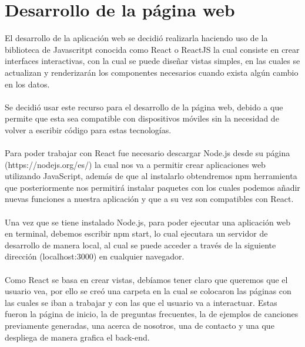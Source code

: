 \documentclass[12pt, a4paper, titlepage]{report}
\begin{document}
\section{Desarrollo de la página web}
El desarrollo de la aplicación web se decidió realizarla haciendo uso de la biblioteca de Javascritpt conocida como React o ReactJS la cual consiste en crear interfaces interactivas, con la cual se puede diseñar vistas simples, en las cuales se actualizan y renderizarán los componentes necesarios cuando exista algún cambio en los datos.\\\\
Se decidió usar este recurso para el desarrollo de la página web, debido a que permite que esta sea compatible con dispositivos móviles sin la necesidad de volver a escribir código para estas tecnologías.\\\\
Para poder trabajar con React fue necesario descargar Node.js desde su página (https://nodejs.org/es/) la cual nos va a permitir crear aplicaciones web utilizando JavaScript, además de que al instalarlo obtendremos npm herramienta que posteriormente nos permitirá instalar paquetes con los cuales podemos añadir nuevas funciones a nuestra aplicación y que a su vez son compatibles con React.\\\\
Una vez que se tiene instalado Node.js, para poder ejecutar una aplicación web en terminal, debemos escribir npm start, lo cual ejecutara un servidor de desarrollo de manera local, al cual se puede acceder a través de la siguiente dirección (localhost:3000) en cualquier navegador.\\\\
Como React se basa en crear vistas, debíamos tener claro que queremos que el usuario vea, por ello se creó una carpeta en la cual se colocaron las páginas con las cuales se iban a trabajar y con las que el usuario va a interactuar. Estas fueron la página de inicio, la de preguntas frecuentes, la de ejemplos de canciones previamente generadas, una acerca de nosotros, una de contacto y una que despliega de manera grafica el back-end.\\\\
\end{document}
